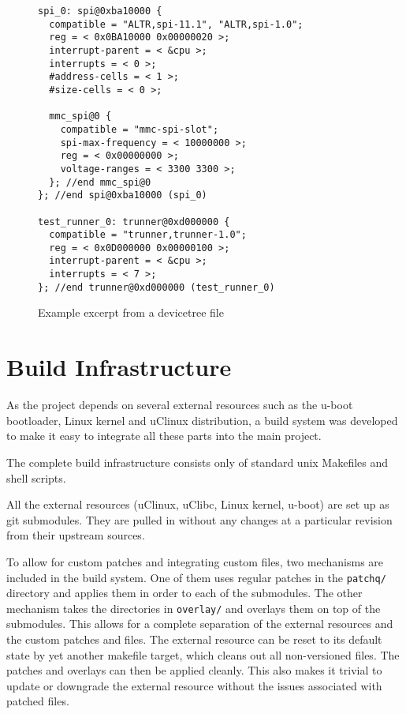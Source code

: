 \begin{figure}[h!]
\lstset{basicstyle=\scriptsize\ttfamily}
\begin{lstlisting}
spi_0: spi@0xba10000 {
  compatible = "ALTR,spi-11.1", "ALTR,spi-1.0";
  reg = < 0x0BA10000 0x00000020 >;
  interrupt-parent = < &cpu >;
  interrupts = < 0 >;
  #address-cells = < 1 >;
  #size-cells = < 0 >;

  mmc_spi@0 {
    compatible = "mmc-spi-slot";
    spi-max-frequency = < 10000000 >;
    reg = < 0x00000000 >;
    voltage-ranges = < 3300 3300 >;
  }; //end mmc_spi@0
}; //end spi@0xba10000 (spi_0)

test_runner_0: trunner@0xd000000 {
  compatible = "trunner,trunner-1.0";
  reg = < 0x0D000000 0x00000100 >;
  interrupt-parent = < &cpu >;
  interrupts = < 7 >;
}; //end trunner@0xd000000 (test_runner_0)
\end{lstlisting}
\caption{Example excerpt from a devicetree file}
\label{listing:dts}
\end{figure}



\newpage
\section{Build Infrastructure}
As the project depends on several external resources such as the u-boot bootloader, Linux kernel
and uClinux distribution, a build system was developed to make it easy to integrate all these
parts into the main project.

The complete build infrastructure consists only of standard unix Makefiles and shell scripts.

All the external resources (uClinux, uClibc, Linux kernel, u-boot) are set up as git submodules.
They are pulled in without any changes at a particular revision from their upstream sources.

To allow for custom patches and integrating custom files, two mechanisms are included in the build
system. One of them uses regular patches in the \texttt{patchq/} directory and applies them in
order to each of the submodules. The other mechanism takes the directories in \texttt{overlay/}
and overlays them on top of the submodules. This allows for a complete separation of the external
resources and the custom patches and files. The external resource can be reset to its default state
by yet another makefile target, which cleans out all non-versioned files. The patches and overlays
can then be applied cleanly. This also makes it trivial to update or downgrade the external
resource without the issues associated with patched files.


